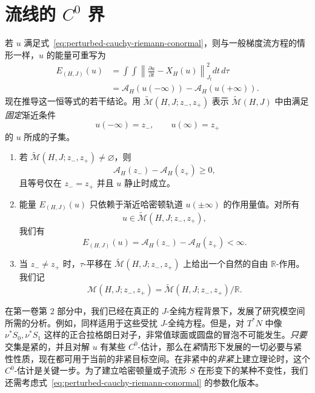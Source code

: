 \section{\personFloer{}流线的 \texorpdfstring{$C^0$}{C⁰} 界}
\label{sec:c0-bounds-floer-trajectories}

若 $u$ 满足式~\eqref{eq:perturbed-cauchy-riemann-conormal}，则与一般梯度流方程的情形一样，$u$ 的能量可重写为
\begin{equation}
\begin{split}
  E_{(H,J)}(u)
  &=\int\!\!\int
    \left\lVert\frac{\partial u}{\partial t}-X_H(u)\right\rVert_{J_t}^2
    dt\,d\tau\\
  &=\mathcal A_H(u(-\infty))-\mathcal A_H(u(+\infty)).
\end{split}
\label{eq:floer-energy-action-drop}
\end{equation}
现在推导这一恒等式的若干结论。用 $\widetilde{\mathcal M}(H,J;z_-,z_+)$ 表示 $\widetilde{\mathcal M}(H,J)$ 中由满足\emph{固定}渐近条件
\[
  u(-\infty)=z_-,\qquad u(\infty)=z_+
\]
的 $u$ 所成的子集。

\begin{enumerate}[label=(\arabic*)]
  \item 若 $\widetilde{\mathcal M}(H,J;z_-,z_+)\ne\varnothing$，则
  \[
    \mathcal A_H(z_-)-\mathcal A_H(z_+)\ge0,
  \]
  且等号仅在 $z_-=z_+$ 并且 $u$ 静止时成立。
  \item 能量 $E_{(H,J)}(u)$ 只依赖于渐近哈密顿轨道 $u(\pm\infty)$ 的作用量值。对所有
  \[
    u\in\widetilde{\mathcal M}(H,J;z_-,z_+),
  \]
  我们有\emph{\termAprioriEnergyBound{}}
  \begin{equation}
    E_{(H,J)}(u)
    =\mathcal A_H(z_-)-\mathcal A_H(z_+)<\infty.
    \label{eq:apriori-energy-bound-asymptotes}
  \end{equation}
  \item 当 $z_-\ne z_+$ 时，$\tau$-平移在 $\widetilde{\mathcal M}(H,J;z_-,z_+)$ 上给出一个自然的自由 $\mathbb R$-作用。我们记
  \[
    \mathcal M(H,J;z_-,z_+)
    =\widetilde{\mathcal M}(H,J;z_-,z_+)/\mathbb R.
  \]
\end{enumerate}

在第一卷第 2 部分中，我们已经在真正的 $J$-全纯方程背景下，发展了研究模空间所需的分析。例如，\termBubblingOffAnalysis{}同样适用于这些受扰 $J$-全纯方程。但是，对 $T^*N$ 中像 $\nu^*S_0,\nu^*S_1$ 这样的正合拉格朗日对子，非常值球面或圆盘的冒泡不可能发生。\emph{只要}交集是紧的，并且对解 $u$ 有某些 $C^0$-估计，那么在\emph{紧}\termLagrangianSubmanifold{}情形下发展的一切必要\termFredholmProperty{}与紧性性质，现在都可用于当前的非紧目标空间。在非紧\termSymplecticManifold{}中的\emph{非紧}\termLagrangianSubmanifold{}上建立\personFloer{}理论时，这个 $C^0$-估计是关键一步。为了建立哈密顿量或子流形 $S$ 在形变下的某种不变性，我们还需考虑式~\eqref{eq:perturbed-cauchy-riemann-conormal} 的参数化版本。

